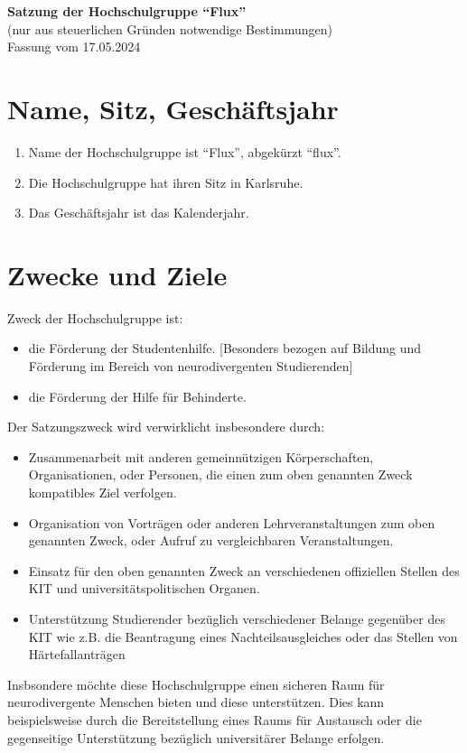 \documentclass[11pt]{article}
\begin{document}
	\begin{center}
		\Large
		\textbf{
			Satzung der Hochschulgruppe ``Flux''}\\
		\normalsize
		(nur aus steuerlichen Gründen notwendige Bestimmungen)\\
		\vspace{10mm}
		Fassung vom 17.05.2024
		\vspace{10mm}
	\end{center}

	\section{Name, Sitz, Geschäftsjahr}
	\begin{enumerate}
		\item Name der Hochschulgruppe ist ``Flux'', abgekürzt ``flux''.
		\item Die Hochschulgruppe hat ihren Sitz in Karlsruhe.
		\item Das Geschäftsjahr ist das Kalenderjahr.
	\end{enumerate}
	\section{Zwecke und Ziele}
    \label{zweck}
	Zweck der Hochschulgruppe ist:
	\begin{itemize}
		\item die Förderung der Studentenhilfe. [Besonders bezogen auf Bildung und Förderung im Bereich von neurodivergenten Studierenden]
		\item die Förderung der Hilfe für Behinderte.
	\end{itemize}
	Der Satzungszweck wird verwirklicht insbesondere durch: 
	\begin{itemize}
		\item Zusammenarbeit mit anderen gemeinnützigen Körperschaften, Organisationen, oder Personen, die einen zum oben genannten Zweck kompatibles Ziel verfolgen.
		\item Organisation von Vorträgen oder anderen Lehrveranstaltungen zum oben genannten Zweck, oder Aufruf zu vergleichbaren Veranstaltungen.
		\item Einsatz für den oben genannten Zweck an verschiedenen offiziellen Stellen des KIT und universitätspolitischen Organen.
        \item Unterstützung Studierender bezüglich verschiedener Belange gegenüber des KIT wie z.B. die Beantragung eines Nachteilsausgleiches oder das Stellen von Härtefallanträgen
	\end{itemize}
    Insbsondere möchte diese Hochschulgruppe einen sicheren Raum für neurodivergente Menschen bieten und diese unterstützen. Dies kann beispielsweise durch die Bereitstellung eines Raums für Austausch oder die gegenseitige Unterstützung bezüglich universitärer Belange erfolgen.
 
\end{document}
